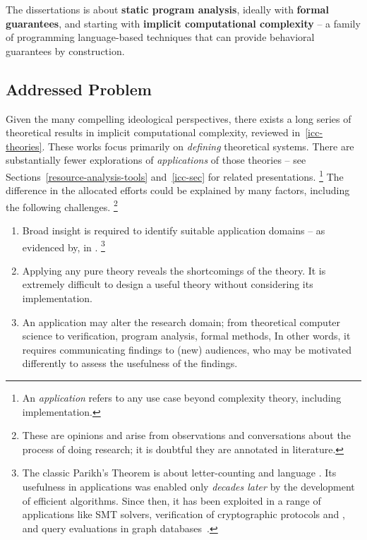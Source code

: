 \begin{mdframed}[backgroundcolor=conceptbase,linecolor=concept,nobreak=true]
The dissertations is about \textbf{static program analysis}, ideally with
\textbf{formal guarantees}, and starting with \textbf{implicit computational
complexity} -- a family of programming language-based techniques that can
provide behavioral guarantees by construction.
\end{mdframed}

\subsection{Addressed Problem}
\label{subsec:problem}

Given the many compelling ideological perspectives, there exists a long series of theoretical results in implicit computational complexity, reviewed in~\autoref{icc-theories}.
These works focus primarily on \emph{defining} theoretical systems.
There are substantially fewer explorations of \emph{applications} of those theories -- see Sections~\ref{resource-analysis-tools} and~\ref{icc-sec} for related presentations.%
\footnote{An \emph{application} refers to any use case beyond complexity theory, including implementation.}
The difference in the allocated efforts could be explained by many factors, including the following challenges.%
\footnote{These are opinions and arise from observations and conversations about the process of doing research; it is doubtful they are annotated in literature.}

\begin{enumerate}

\item Broad insight is required to identify suitable application domains -- as
      evidenced by, \eg {} in .%
      \footnote{The classic Parikh's Theorem is about letter-counting and language .
      Its usefulness in applications was enabled only \emph{decades later} by the development of efficient algorithms.
      Since then,  it has been exploited in a range of applications like SMT solvers, verification of cryptographic protocols and , and query evaluations in graph databases~\cite[pg. 2]{hague2024}.}

\item Applying any pure theory reveals the shortcomings of the theory.
      It is extremely difficult to design a useful theory without considering its implementation.

\item An application may alter the research domain; \eg from theoretical computer science to verification, program analysis, formal methods, \etc
      In other words, it requires communicating findings to (new) audiences, who may be motivated differently to assess the usefulness of the findings.

\end{enumerate}

